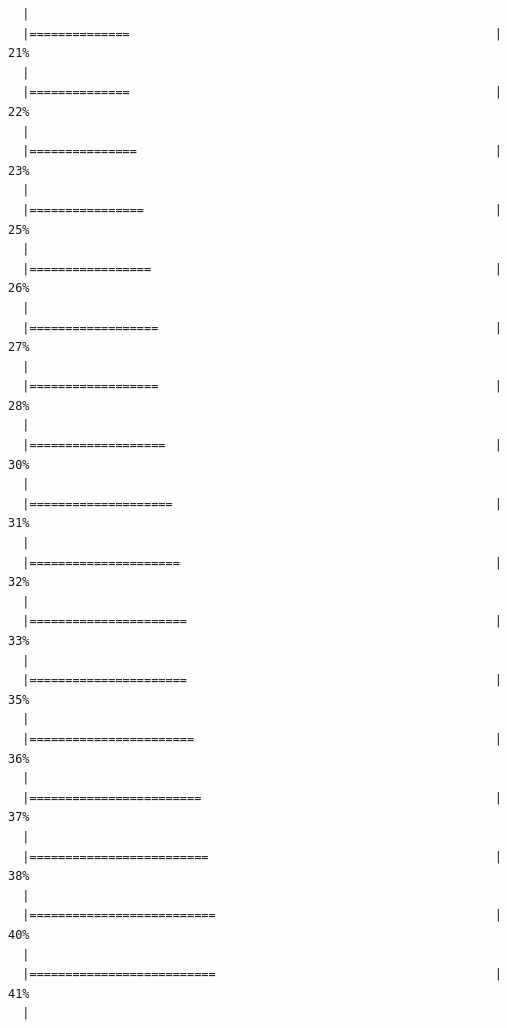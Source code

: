 \documentclass[]{article}
\begin{document}
\begin{verbatim}
  |                                                                       
  |==============                                                   |  21%
  |                                                                       
  |==============                                                   |  22%
  |                                                                       
  |===============                                                  |  23%
  |                                                                       
  |================                                                 |  25%
  |                                                                       
  |=================                                                |  26%
  |                                                                       
  |==================                                               |  27%
  |                                                                       
  |==================                                               |  28%
  |                                                                       
  |===================                                              |  30%
  |                                                                       
  |====================                                             |  31%
  |                                                                       
  |=====================                                            |  32%
  |                                                                       
  |======================                                           |  33%
  |                                                                       
  |======================                                           |  35%
  |                                                                       
  |=======================                                          |  36%
  |                                                                       
  |========================                                         |  37%
  |                                                                       
  |=========================                                        |  38%
  |                                                                       
  |==========================                                       |  40%
  |                                                                       
  |==========================                                       |  41%
  |                                                                       

\end{verbatim}
\end{document}
